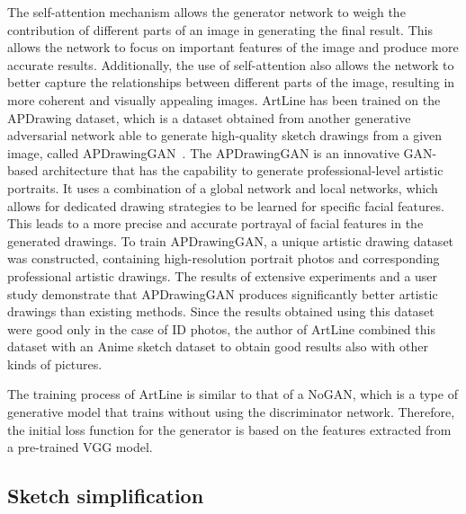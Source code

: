 \noindent The self-attention mechanism allows the generator network to weigh the contribution of different parts of an image in generating the final result. This allows the network to focus on important features of the image and produce more accurate results. Additionally, the use of self-attention also allows the network to better capture the relationships between different parts of the image, resulting in more coherent and visually appealing images.
ArtLine has been trained on the APDrawing dataset, which is a dataset obtained from another generative adversarial network able to generate high-quality sketch drawings from a given image, called APDrawingGAN~\cite{APDrawingGAN}. The APDrawingGAN is an innovative GAN-based architecture that has the capability to generate professional-level artistic portraits. It uses a combination of a global network and local networks, which allows for dedicated drawing strategies to be learned for specific facial features. This leads to a more precise and accurate portrayal of facial features in the generated drawings. To train APDrawingGAN, a unique artistic drawing dataset was constructed, containing high-resolution portrait photos and corresponding professional artistic drawings. The results of extensive experiments and a user study demonstrate that APDrawingGAN produces significantly better artistic drawings than existing methods. Since the results obtained using this dataset were good only in the case of ID photos, the author of ArtLine combined this dataset with an Anime sketch dataset to obtain good results also with other kinds of pictures.

\noindent The training process of ArtLine is similar to that of a NoGAN, which is a type of generative model that trains without using the discriminator network. Therefore, the initial loss function for the generator is based on the features extracted from a pre-trained VGG model.

\subsection{Sketch simplification}
